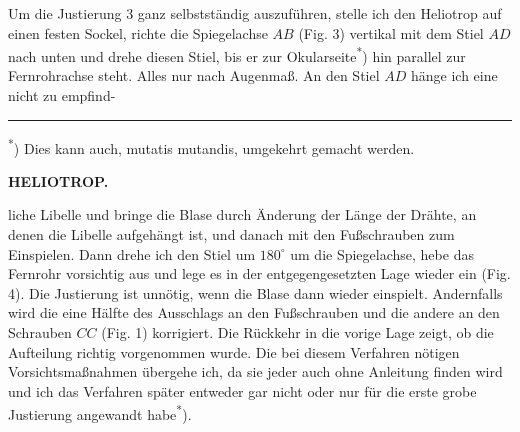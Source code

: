 \par\noindent\hspace*{\parindent}Um die Justierung 3 ganz selbstständig auszuführen, stelle ich den Heliotrop auf einen festen Sockel, richte die Spiegelachse $AB$ (Fig. 3) vertikal mit dem Stiel $AD$ nach unten und drehe diesen Stiel, bis er zur Okularseite\textsuperscript{*}) hin parallel zur Fernrohrachse steht. Alles nur nach Augenmaß. An den Stiel $AD$ hänge ich eine nicht zu empfind-
\par\medskip\noindent\rule{4cm}{.4pt}\par
\begingroup\footnotesize\noindent\hspace*{\parindent}\textsuperscript{*}) Dies kann auch, mutatis mutandis, umgekehrt gemacht werden.\par\endgroup

\par\clearpage
\noindent\null\hfill{\small\textbf{HELIOTROP.}}\hfill{}\par\medskip
\noindent liche Libelle und bringe die Blase durch Änderung der Länge der Drähte, an denen die Libelle aufgehängt ist,  und danach mit den Fußschrauben  zum Einspielen. Dann drehe ich den Stiel um $180^\circ$ um die Spiegelachse, hebe das Fernrohr vorsichtig aus und lege es in der entgegengesetzten Lage wieder ein (Fig. 4). Die Justierung ist unnötig, wenn die Blase dann wieder einspielt. Andernfalls wird die eine Hälfte des Ausschlags an den Fußschrauben und die andere an den Schrauben $CC$ (Fig. 1) korrigiert. Die Rückkehr in die vorige Lage zeigt, ob die Aufteilung richtig vorgenommen wurde. Die bei diesem Verfahren nötigen Vorsichtsmaßnahmen übergehe ich, da sie jeder auch ohne Anleitung finden wird und ich das Verfahren später entweder gar nicht oder nur für die erste grobe Justierung angewandt habe\textsuperscript{*}).

